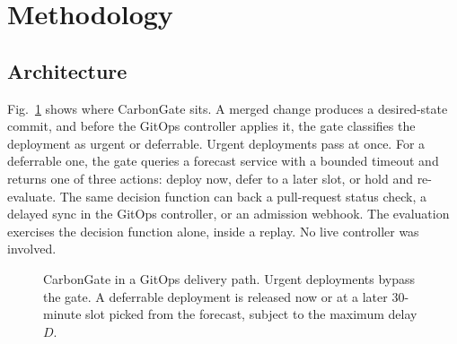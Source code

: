 \documentclass[journal]{IEEEtran}
\begin{document}
\section{Methodology}
\label{sec:method}

\subsection{Architecture}
Fig.~\ref{fig:arch} shows where CarbonGate sits. A merged change produces a desired-state commit, and before the GitOps controller applies it, the gate classifies the deployment as urgent or deferrable. Urgent deployments pass at once. For a deferrable one, the gate queries a forecast service with a bounded timeout and returns one of three actions: deploy now, defer to a later slot, or hold and re-evaluate. The same decision function can back a pull-request status check, a delayed sync in the GitOps controller, or an admission webhook. The evaluation exercises the decision function alone, inside a replay. No live controller was involved.

\begin{figure}[!t]
\centering
{}
\caption{CarbonGate in a GitOps delivery path. Urgent deployments bypass the gate. A deferrable deployment is released now or at a later 30-minute slot picked from the forecast, subject to the maximum delay $D$.}
\label{fig:arch}
\end{figure}
\end{document}
